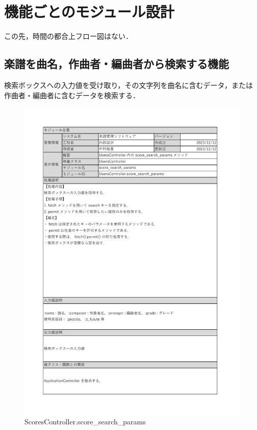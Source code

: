 \section{機能ごとのモジュール設計}
この先，時間の都合上フロー図はない．

\vspace{-0.5cm}
\subsection*{楽譜を曲名，作曲者・編曲者から検索する機能}
検索ボックスへの入力値を受け取り，その文字列を曲名に含むデータ，または
作曲者・編曲者に含むデータを検索する．
\begin{figure}[H]
    \centering
    \includegraphics[scale=0.5]{img/Method/score_search_params}
    \caption{ScoresController.score\_search\_params}
    \label{ScoresController.score-search-params}
\end{figure}
